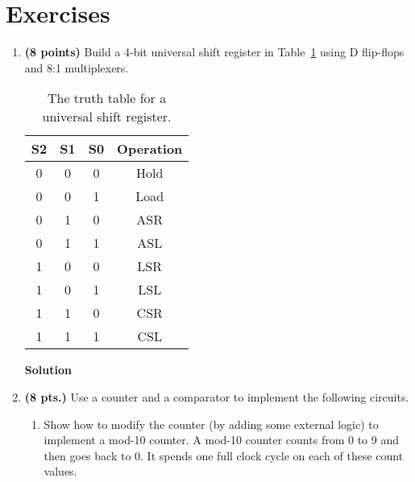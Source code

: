 \section{Exercises}
\label{section:sequentialBB}
\graphicspath{ {./chapter06/FigHw} }


\begin{enumerate}
\item \textbf{ (8 points)} Build a 4-bit universal shift register in
Table~\ref{table:uni} using D flip-flops and 8:1 multiplexers.

\begin{table}
\begin{tabular}{c|c|c||c}
S2 & S1 & S0 & Operation \\ \hline
0  &  0 &  0 & Hold \\ \hline
0  &  0 &  1 & Load \\ \hline
0  &  1 &  0 & ASR  \\ \hline
0  &  1 &  1 & ASL  \\ \hline
1  &  0 &  0 & LSR  \\ \hline
1  &  0 &  1 & LSL  \\ \hline
1  &  1 &  0 & CSR  \\ \hline
1  &  1 &  1 & CSL  \\ 
\end{tabular}
\caption{The truth table for a universal shift register.}
\label{table:uni}
\end{table}

\begin{onlysolution}  \textbf{Solution} \itshape{
\begin{figure}[ht]
\end{figure}
}\end{onlysolution} 

\item \textbf{ (8 pts.)} Use a counter and a comparator
to implement the following circuits.

\begin{enumerate}
\item Show how to modify the counter (by adding some external logic)
to implement a mod-10 counter.  A mod-10 counter counts from 0 to
9 and then goes back to 0.  It spends one full clock cycle on each
of these count values.


\end{enumerate}
\end{enumerate}
